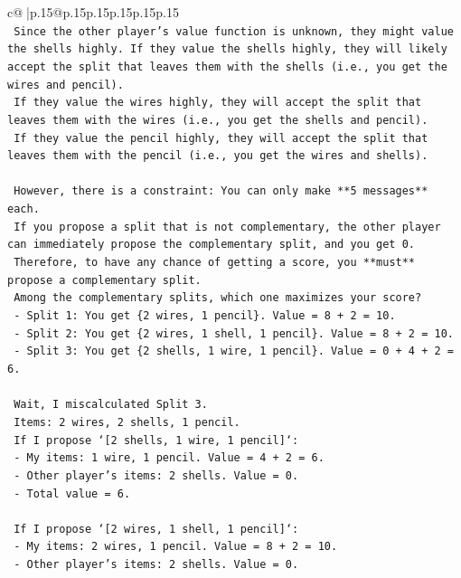 \documentclass{article}
\begin{document}
{\begin{supertabular}{c@{$\;$}|p{.15\linewidth}@{}p{.15\linewidth}p{.15\linewidth}p{.15\linewidth}p{.15\linewidth}p{.15\linewidth}}
{{{\\ 
\texttt{    Since the other player's value function is unknown, they might value the shells highly. If they value the shells highly, they will likely accept the split that leaves them with the shells (i.e., you get the wires and pencil).} \\
\texttt{    If they value the wires highly, they will accept the split that leaves them with the wires (i.e., you get the shells and pencil).} \\
\texttt{    If they value the pencil highly, they will accept the split that leaves them with the pencil (i.e., you get the wires and shells).} \\
\\ 
\texttt{    However, there is a constraint: You can only make **5 messages** each.} \\
\texttt{    If you propose a split that is not complementary, the other player can immediately propose the complementary split, and you get 0.} \\
\texttt{    Therefore, to have any chance of getting a score, you **must** propose a complementary split.} \\
\texttt{    Among the complementary splits, which one maximizes your score?} \\
\texttt{    {-}   Split 1: You get \{2 wires, 1 pencil\}. Value = 8 + 2 = 10.} \\
\texttt{    {-}   Split 2: You get \{2 wires, 1 shell, 1 pencil\}. Value = 8 + 2 = 10.} \\
\texttt{    {-}   Split 3: You get \{2 shells, 1 wire, 1 pencil\}. Value = 0 + 4 + 2 = 6.} \\
\\ 
\texttt{    Wait, I miscalculated Split 3.} \\
\texttt{    Items: 2 wires, 2 shells, 1 pencil.} \\
\texttt{    If I propose `{[}2 shells, 1 wire, 1 pencil{]}`:} \\
\texttt{    {-}   My items: 1 wire, 1 pencil. Value = 4 + 2 = 6.} \\
\texttt{    {-}   Other player's items: 2 shells. Value = 0.} \\
\texttt{    {-}   Total value = 6.} \\
\\ 
\texttt{    If I propose `{[}2 wires, 1 shell, 1 pencil{]}`:} \\
\texttt{    {-}   My items: 2 wires, 1 pencil. Value = 8 + 2 = 10.} \\
\texttt{    {-}   Other player's items: 2 shells. Value = 0.} \\
}}}
\end{supertabular}}
\end{document}
